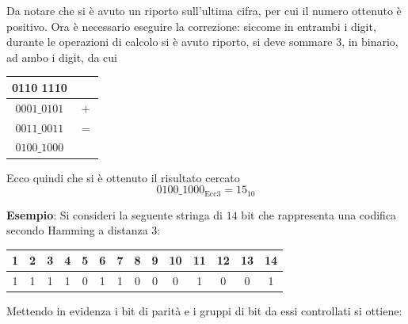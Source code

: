 \documentclass[a4paper]{extarticle}
\renewcommand\arraystretch{}
\begin{document}
\vspace{1em}
\noindent
Da notare che si è avuto un riporto sull'ultima cifra, per cui il numero ottenuto è positivo. Ora è necessario eseguire la correzione: siccome in entrambi i digit, durante le operazioni di calcolo si è avuto riporto, si deve sommare $3$, in binario, ad ambo i digit, da cui

\noindent
\begin{table}[H]
\setlength{\tabcolsep}{4pt}
\renewcommand{\arraystretch}{1.2}
\centering
\begin{tabular}{cc}
    0110 1110 & \\
    \hline
    $0001\_0101$ & $+$\\
    \hline
    $0011\_0011$ & $=$\\
    \hline
    $0100\_1000$ & \\
\end{tabular}
\end{table}

\vspace{1em}
\noindent
Ecco quindi che si è ottenuto il risultato cercato
\[0100\_1000_\text{Ecc3} = 15_{10}\]

\vspace{2em}
\noindent
\textbf{Esempio}: Si consideri la seguente stringa di $14$ bit che rappresenta una codifica secondo Hamming a distanza $3$:

\noindent
\begin{table}[H]
\setlength{\tabcolsep}{4pt}
\renewcommand{\arraystretch}{1.2}
\centering
\begin{tabular}{|c|c|c|c|c|c|c|c|c|c|c|c|c|c|}
    \hline
    1 & 2 & 3 & 4 & 5 & 6 & 7 & 8 & 9 & 10 & 11 & 12 & 13 & 14\\
    \hline
    1 & 1 & 1 & 1 & 0 & 1 & 1 & 0 & 0 & 0 & 1 & 0 & 0 & 1\\
    \hline
\end{tabular}
\end{table}

\vspace{1em}
\noindent
Mettendo in evidenza i bit di parità e i gruppi di bit da essi controllati si ottiene:
\end{document}
